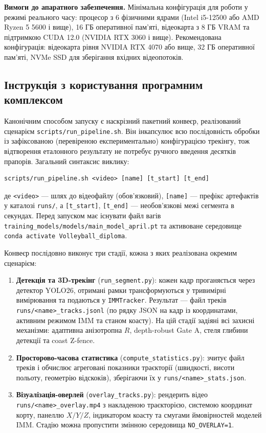 \textbf{Вимоги до апаратного забезпечення.} Мінімальна конфігурація для роботи у
режимі реального часу: процесор з 6 фізичними ядрами (Intel i5-12500 або AMD Ryzen
5 5600 і вище), 16 ГБ оперативної пам'яті, відеокарта з 8 ГБ VRAM та підтримкою
CUDA 12.0 (NVIDIA RTX 3060 і вище). Рекомендована конфігурація: відеокарта рівня
NVIDIA RTX 4070 або вище, 32 ГБ оперативної пам'яті, NVMe SSD для зберігання
вхідних відеопотоків.

\subsection{Інструкція з користування програмним комплексом}

Канонічним способом запуску є наскрізний пакетний конвеєр, реалізований сценарієм
\texttt{scripts/run\_pipeline.sh}. Він інкапсулює всю послідовність обробки із
зафіксованою (перевіреною експериментально) конфігурацією трекінгу, тож
відтворення еталонного результату не потребує ручного введення десятків прапорів.
Загальний синтаксис виклику:
\begin{verbatim}
scripts/run_pipeline.sh <video> [name] [t_start] [t_end]
\end{verbatim}
де \texttt{<video>} --- шлях до відеофайлу (обов'язковий), \texttt{[name]} ---
префікс артефактів у каталозі \texttt{runs/}, а \texttt{[t\_start]},
\texttt{[t\_end]} --- необов'язкові межі сегмента в секундах. Перед запуском має
існувати файл вагів \texttt{training\_models/models/main\_model\_april.pt} та
активоване середовище \texttt{conda activate Volleyball\_diploma}.

Конвеєр послідовно виконує три стадії, кожна з яких реалізована окремим сценарієм:
\begin{enumerate}
    \item \textbf{Детекція та 3D-трекінг} (\texttt{run\_segment.py}): кожен кадр
    проганяється через детектор \gls{YOLO}26, отримані рамки трансформуються у
    тривимірні вимірювання та подаються у \texttt{IMMTracker}. Результат --- файл
    треків \texttt{runs/<name>\_tracks.jsonl} (по рядку JSON на кадр із
    координатами, активним режимом \gls{IMM} та станом коасту). На цій стадії
    задіяні всі захисні механізми: адаптивна анізотропна $R$, depth-robust Gate A,
    стеля глибини детекції та coast Z-fence.
    \item \textbf{Просторово-часова статистика} (\texttt{compute\_statistics.py}):
    зчитує файл треків і обчислює агреговані показники траєкторії (швидкості,
    висоти польоту, геометрію відскоків), зберігаючи їх у
    \texttt{runs/<name>\_stats.json}.
    \item \textbf{Візуалізація-оверлей} (\texttt{overlay\_tracks.py}): рендерить
    відео \texttt{runs/<name>\_overlay.mp4} з накладеною траєкторією, системою
    координат корту, панеллю $X/Y/Z$, індикатором коасту та смугами ймовірностей
    моделей \gls{IMM}. Стадію можна пропустити змінною середовища
    \texttt{NO\_OVERLAY=1}.
\end{enumerate}

